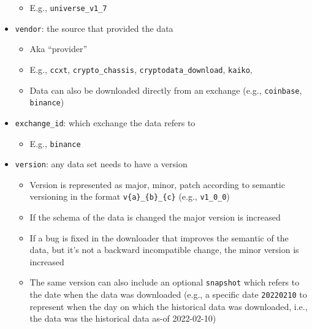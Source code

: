 \documentclass[11pt, reqno]{amsart}
\theoremstyle{definition}
\theoremstyle{remark}
\begin{document}
\begin{itemize}
\begin{itemize}
        \item E.g., \verb|universe_v1_7|
      \end{itemize}

    \item \verb|vendor|: the source that provided the data

      \begin{itemize}
        \item Aka ``provider''

        \item E.g., \verb|ccxt|, \verb|crypto_chassis|, \verb|cryptodata_download|,
          \verb|kaiko|,

        \item Data can also be downloaded directly from an exchange (e.g.,
          \verb|coinbase|, \verb|binance|)
      \end{itemize}

    \item \verb|exchange_id|: which exchange the data refers to

      \begin{itemize}
        \item E.g., \verb|binance|
      \end{itemize}

    \item \verb|version|: any data set needs to have a version

      \begin{itemize}
        \item Version is represented as major, minor, patch according to semantic
          versioning in the format \verb|v{a}_{b}_{c}| (e.g., \verb|v1_0_0|)

        \item If the schema of the data is changed the major version is increased

        \item If a bug is fixed in the downloader that improves the semantic of the
          data, but it's not a backward incompatible change, the minor version is
          increased

        \item The same version can also include an optional \verb|snapshot| which
          refers to the date when the data was downloaded (e.g., a specific date
          \verb|20220210| to represent when the day on which the historical data
          was downloaded, i.e., the data was the historical data as-of 2022-02-10)


\end{itemize}
\end{itemize}
\end{document}
